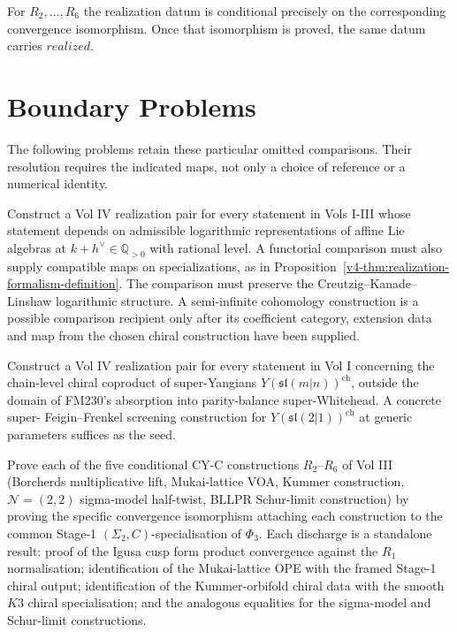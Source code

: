 For \(R_2,\ldots,R_6\) the realization datum is conditional precisely
on the corresponding convergence isomorphism. Once that isomorphism is
proved, the same datum carries \(realized\).

\section{Boundary Problems}
\label{v4-sec:open-ends-precisely}

The following problems retain these particular omitted comparisons.
Their resolution requires the indicated maps, not only a choice of
reference or a numerical identity.

\begin{openproblem}
\label{v4-open:admissible-realization}
Construct a Vol IV realization pair for every statement in Vols
I-III whose statement depends on admissible logarithmic
representations of affine Lie algebras at \(k + h^\vee \in \mathbb{Q}_{>0}\)
with rational level. A functorial comparison must also supply compatible maps on
specializations, as in
Proposition~\ref{v4-thm:realization-formalism-definition}. The comparison
must preserve the Creutzig--Kanade--Linshaw logarithmic structure.
A semi-infinite cohomology construction is a possible comparison
recipient only after its coefficient category, extension data and
map from the chosen chiral construction have been supplied.
\end{openproblem}

\begin{openproblem}
\label{v4-open:super-yangian-chain-level}
Construct a Vol IV realization pair for every statement in Vol
I concerning the chain-level chiral coproduct of super-Yangians
\(Y(\mathfrak{sl}(m|n))^{\mathrm{ch}}\), outside the domain of FM230's
absorption into parity-balance super-Whitehead. A concrete super-
Feigin--Frenkel screening construction for \(Y(\mathfrak{sl}(2|1))^{\mathrm{ch}}\)
at generic parameters suffices as the seed.
\end{openproblem}

\begin{openproblem}
\label{v4-open:cy-c-bridges}
Prove each of the five conditional CY-C constructions \(R_2\)--\(R_6\) of
Vol III (Borcherds multiplicative lift, Mukai-lattice VOA, Kummer
construction, \(\mathcal{N}=(2,2)\) sigma-model half-twist, BLLPR
Schur-limit construction) by proving
the specific convergence isomorphism attaching each construction to the
common Stage-1 \((\Sigma_2,C)\)-specialisation of \(\Phi_3\). Each
discharge is a standalone result: proof of the Igusa cusp form
product convergence against the \(R_1\) normalisation; identification
of the Mukai-lattice OPE with the framed Stage-1 chiral output;
identification of the Kummer-orbifold chiral data with the smooth
\(K3\) chiral specialisation; and the analogous equalities for the
sigma-model and Schur-limit constructions.
\end{openproblem}

